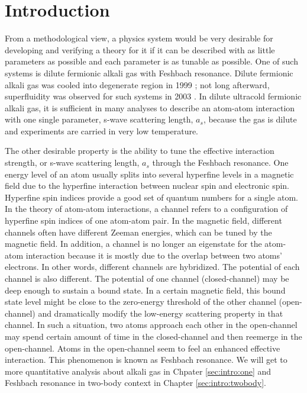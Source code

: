 
\chapter{Introduction}
From  a methodological view, a physics system  would be very desirable for developing and  verifying a theory for it if  it can be described with  as little parameters as possible and  each parameter  is as tunable as possible. One of such systems is dilute fermionic alkali gas with Feshbach resonance.  Dilute fermionic alkali gas was cooled into degenerate region in 1999 \cite{DeMarco1999}; not long afterward,  superfluidity was observed for such systems in 2003 \cite{Regal2003}.  In dilute ultracold fermionic alkali gas, it is sufficient in many analyses to describe an atom-atom interaction with one single parameter, s-wave scattering length, $a_{s}$, because the gas is dilute and experiments are carried in very low temperature.       

The other desirable property is the ability to  tune the effective interaction strength, or s-wave scattering length, $a_{s}$ through the Feshbach resonance.  One energy level of an atom  usually splits into several hyperfine levels in a magnetic field  due to the hyperfine interaction between nuclear spin and electronic spin. Hyperfine spin indices provide a good set of quantum numbers for a single atom.  In the theory of  atom-atom interactions, a channel refers to a  configuration of hyperfine spin indices of one atom-atom pair. In the magnetic field, different channels often have different Zeeman energies, which can be tuned by the magnetic field.  In addition, a channel is no longer an eigenstate for the atom-atom interaction because it is mostly due to the overlap between two atoms' electrons.  In other words, different channels are hybridized.  The potential of each channel is also different.  The potential of one  channel (closed-channel) may be deep enough to sustain a bound state.  In a certain magnetic field,  this bound state level might be close to the zero-energy threshold of the other channel (open-channel) and  dramatically modify the low-energy scattering property in that channel.   In such a situation, two atoms approach each other in the open-channel may spend certain amount of time in the closed-channel and then reemerge in the open-channel.  Atoms in the open-channel seem to feel an enhanced effective interaction.  This phenomenon is known as Feshbach resonance.    We will get to more quantitative analysis about alkali gas in Chpater \ref{sec:intro:one} and Feshbach resonance in two-body context in Chapter \ref{sec:intro:twobody}. 




